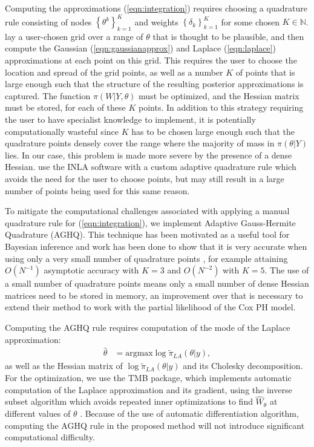 \documentclass[ba]{imsart}
\begin{document}
Computing the approximations (\ref{eqn:integration}) requires choosing a quadrature rule consisting of nodes $\left\{\theta^{k}\right\}_{k=1}^{K}$ and weights $\left\{\delta_{k}\right\}_{k=1}^{K}$ for some chosen $K\in\mathbb{N}$. \cite{casecross} lay a user-chosen grid over a range of $\theta$ that is thought to be plausible, and then compute the Gaussian (\ref{eqn:gaussianapprox}) and Laplace (\ref{eqn:laplace}) approximations at each point on this grid. This requires the user to choose the location and spread of the grid points, as well as a number $K$
of points that is large enough such that the structure of the resulting posterior approximations is captured. The function $\pi(W|Y,\theta)$ must be optimized, and the Hessian matrix must be stored, for each of these $K$ points. In addition to this strategy requiring the user to have specialist knowledge to implement, it is potentially computationally wasteful since $K$ has to be chosen large enough such that the quadrature points densely cover the range where the majority of mass in $\pi(\theta|Y)$ lies. In our case, this problem is made more severe by the presence of a dense Hessian. \cite{inlacoxph} use the INLA software with a custom adaptive quadrature rule which avoids the need for the user to choose points, but may still result in a large number of points being used for this same reason.


To mitigate the computational challenges associated with applying a manual quadrature rule for (\ref{eqn:integration}), we implement Adaptive Gauss-Hermite Quadrature (AGHQ). This technique has been motivated as a useful tool for Bayesian inference \citep{nayloradaptive} and work has been done to show that it is very accurate when using only a very small number of quadrature points \citep{adaptive_GH_1994,adaptive_GH_2020}, for example attaining $O(N^{-1})$ asymptotic accuracy with $K = 3$ and $O(N^{-2})$ with $K = 5$. The use of a small number of quadrature points means only a small number of dense Hessian matrices need to be stored in memory, an improvement over \cite{casecross} that is necessary to extend their method to work with the partial likelihood of the Cox PH model.

Computing the AGHQ rule requires computation of the mode of the Laplace approximation:
\begin{equation}\begin{aligned}
\widehat{\theta} &= \text{argmax}\log\widetilde{\pi}_{LA}(\theta|y),
\end{aligned}\end{equation}
as well as the Hessian matrix of $\log\widetilde{\pi}_{LA}(\theta|y)$ and its Cholesky decomposition. For the optimization, we use the TMB package, which implements automatic computation of the Laplace approximation and its gradient, using the inverse subset algorithm which avoids repeated inner optimizations to find $\widehat{W}_{\theta}$ at different values of $\theta$ \citep{tmb}. Because of the use of automatic differentiation algorithm, computing the AGHQ rule in the proposed method will not introduce significant computational difficulty.
\end{document}
